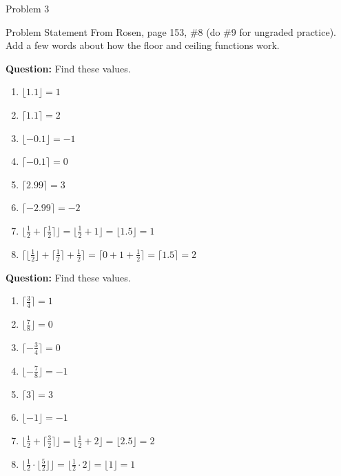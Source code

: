 \begin{problem}{Problem 3}
    \begin{statement}{Problem Statement}
        From Rosen, page 153, \#8 (do \#9 for ungraded practice). Add a few words about how the floor and ceiling functions work.
    \end{statement}

    \begin{highlight}[Solution - \#8]
        \noindent \textbf{Question:} Find these values.

        \begin{enumerate}[label=(\alph*)]
            \item $\lfloor 1.1 \rfloor = 1$
            \item $\lceil 1.1 \rceil = 2$
            \item $\lfloor -0.1 \rfloor = -1$
            \item $\lceil -0.1 \rceil = 0$
            \item $\lceil 2.99 \rceil = 3$
            \item $\lceil -2.99 \rceil = -2$
            \item $\lfloor \frac{1}{2} + \lceil \frac{1}{2} \rceil \rfloor = \lfloor \frac{1}{2} + 1 \rfloor = \lfloor 1.5 \rfloor = 1$
            \item $\lceil \lfloor \frac{1}{2} \rfloor + \lceil \frac{1}{2} \rceil + \frac{1}{2} \rceil = \lceil 0 + 1 + \frac{1}{2} \rceil = \lceil 1.5 \rceil = 2$
        \end{enumerate}
    \end{highlight}

    \begin{highlight}[Solution - \#9]
        \noindent \textbf{Question:} Find these values.

        \begin{enumerate}[label=(\alph*)]
            \item $\lceil \frac{3}{4} \rceil = 1$
            \item $\lfloor \frac{7}{8} \rfloor = 0$
            \item $\lceil -\frac{3}{4} \rceil = 0$
            \item $\lfloor -\frac{7}{8} \rfloor = -1$
            \item $\lceil 3 \rceil = 3$
            \item $\lfloor -1 \rfloor = -1$
            \item $\lfloor \frac{1}{2} + \lceil \frac{3}{2} \rceil \rfloor = \lfloor \frac{1}{2} + 2 \rfloor = \lfloor 2.5 \rfloor = 2$
            \item $\lfloor \frac{1}{2} \cdot \lfloor \frac{5}{2} \rfloor \rfloor = \lfloor \frac{1}{2} \cdot 2 \rfloor = \lfloor 1 \rfloor = 1$
        \end{enumerate}
    \end{highlight}


\end{problem}
